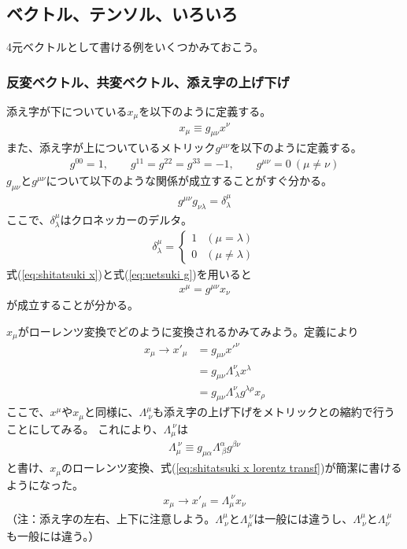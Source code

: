 \documentclass[10pt,a4paper]{jarticle}
\begin{document}
\subsection{ベクトル、テンソル、いろいろ}
4元ベクトルとして書ける例をいくつかみておこう。

\subsubsection{反変ベクトル、共変ベクトル、添え字の上げ下げ}
添え字が下についている$x_\mu$を以下のように定義する。
\begin{align}
x_\mu \equiv g_{\mu\nu} x^\nu \label{eq:shitatsuki x}
\end{align}
また、添え字が上についているメトリック$g^{\mu\nu}$を以下のように定義する。
\begin{align}
g^{00} = 1, \qquad
g^{11} = 
g^{22} = 
g^{33} = -1, \qquad
g^{\mu\nu} = 0~(\mu\neq\nu) \label{eq:uetsuki g}
\end{align}
$g_{\mu\nu}$と$g^{\mu\nu}$について以下のような関係が成立することがすぐ分かる。
\begin{align}
g^{\mu\nu} g_{\nu\lambda} = \delta^\mu_\lambda
\end{align}
ここで、$\delta^\mu_\lambda$はクロネッカーのデルタ。
\begin{align}
\delta^\mu_\lambda = \begin{cases}
1 & (\mu = \lambda) \\
0 & (\mu \neq \lambda)
\end{cases}
\end{align}
式(\ref{eq:shitatsuki x})と式(\ref{eq:uetsuki g})を用いると
\begin{align}
x^\mu = g^{\mu\nu} x_\nu
\end{align}
が成立することが分かる。

$x_\mu$がローレンツ変換でどのように変換されるかみてみよう。定義により
\begin{align}
x_{\mu} \to x'_\mu
&= g_{\mu\nu} x'^\nu \nonumber\\
&= g_{\mu\nu} \Lambda^\nu_{~\lambda} x^\lambda \nonumber\\
&= g_{\mu\nu} \Lambda^\nu_{~\lambda} g^{\lambda\rho} x_\rho \label{eq:shitatsuki x lorentz transf}
\end{align}
%
ここで、$x^\mu$や$x_\mu$と同様に、$\Lambda^\mu_{~\nu}$も添え字の上げ下げをメトリックとの縮約で行うことにしてみる。
これにより、$\Lambda_{\mu}^{~\nu}$は
\begin{align}
\Lambda_\mu^{~\nu} \equiv g_{\mu\alpha} \Lambda^\alpha_{~\beta} g^{\beta\nu}
\end{align}
と書け、$x_\mu$のローレンツ変換、式(\ref{eq:shitatsuki x lorentz transf})が簡潔に書けるようになった。
\begin{align}
x_\mu \to x'_\mu = \Lambda_\mu^{~\nu} x_\nu
\end{align}
（注：添え字の左右、上下に注意しよう。$\Lambda^\mu_{~\nu}$と$\Lambda_\mu^{~\nu}$は一般には違うし、$\Lambda^\mu_{~\nu}$と$\Lambda_\nu^{~\mu}$も一般には違う。）
\end{document}
